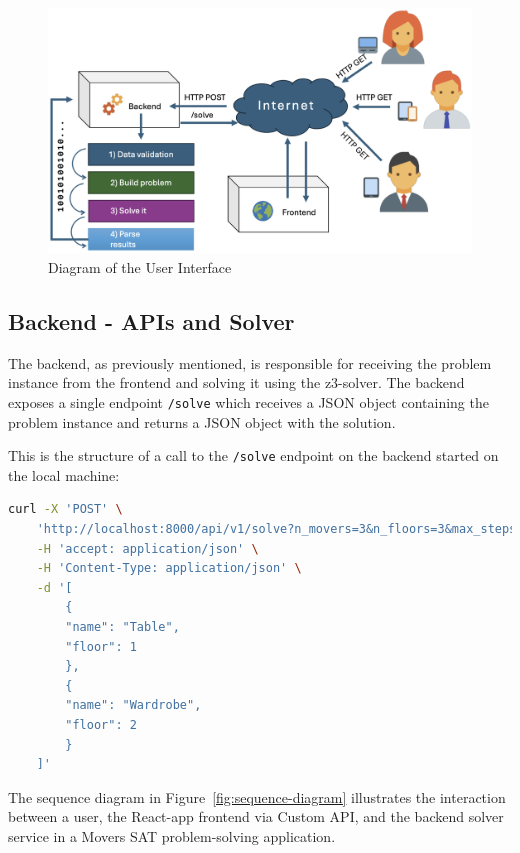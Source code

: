\documentclass[a4paper, 11pt]{article}
\begin{document}
\begin{figure}[H]
	\centering
	\includegraphics[width=\textwidth]{./images/System_Design.png}
	\caption{Diagram of the User Interface}
	\label{fig:ui_diagram}
\end{figure}

\subsection{Backend - APIs and Solver}
The backend, as previously mentioned, is responsible for receiving the problem instance from the frontend and solving it using the z3-solver. The backend exposes a single endpoint \texttt{/solve} which receives a JSON object containing the problem instance and returns a JSON object with the solution.

This is the structure of a call to the \texttt{/solve} endpoint on the backend started on the local machine:

\begin{lstlisting}[language=bash, showspaces=false, breaklines=true]
curl -X 'POST' \
	'http://localhost:8000/api/v1/solve?n_movers=3&n_floors=3&max_steps=10' \
	-H 'accept: application/json' \
	-H 'Content-Type: application/json' \
	-d '[
		{
		"name": "Table",
		"floor": 1
		},
		{
		"name": "Wardrobe",
		"floor": 2
		}
	]'
\end{lstlisting}

The sequence diagram in Figure~\ref{fig:sequence-diagram} illustrates the interaction between a user, the React-app frontend via Custom API, and the backend solver service in a Movers SAT problem-solving application.
\end{document}
